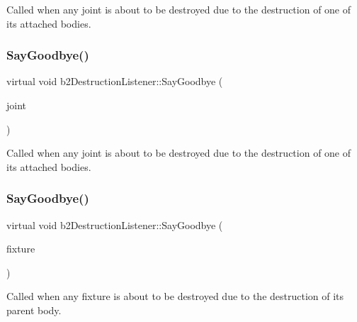 Called when any joint is about to be destroyed due to the destruction of one of its attached bodies. \mbox{\label{classb2DestructionListener_a6cd15baa6e5c33118cf7173ab5bf6d58}} 
\subsubsection{\texorpdfstring{Say\+Goodbye()}{SayGoodbye()}\hspace{0.1cm}{\footnotesize\ttfamily [2/4]}}
{\footnotesize\ttfamily virtual void b2\+Destruction\+Listener\+::\+Say\+Goodbye (\begin{DoxyParamCaption}\item[{\hyperlink{classb2Joint}{b2\+Joint} $\ast$}]{joint }\end{DoxyParamCaption})\hspace{0.3cm}{\ttfamily [pure virtual]}}

Called when any joint is about to be destroyed due to the destruction of one of its attached bodies. \mbox{\label{classb2DestructionListener_ab327c0073d162112c38d2fe8f8b9fce3}} 
\subsubsection{\texorpdfstring{Say\+Goodbye()}{SayGoodbye()}\hspace{0.1cm}{\footnotesize\ttfamily [3/4]}}
{\footnotesize\ttfamily virtual void b2\+Destruction\+Listener\+::\+Say\+Goodbye (\begin{DoxyParamCaption}\item[{\hyperlink{classb2Fixture}{b2\+Fixture} $\ast$}]{fixture }\end{DoxyParamCaption})\hspace{0.3cm}{\ttfamily [pure virtual]}}

Called when any fixture is about to be destroyed due to the destruction of its parent body. \mbox{\label{classb2DestructionListener_ab327c0073d162112c38d2fe8f8b9fce3}} 
